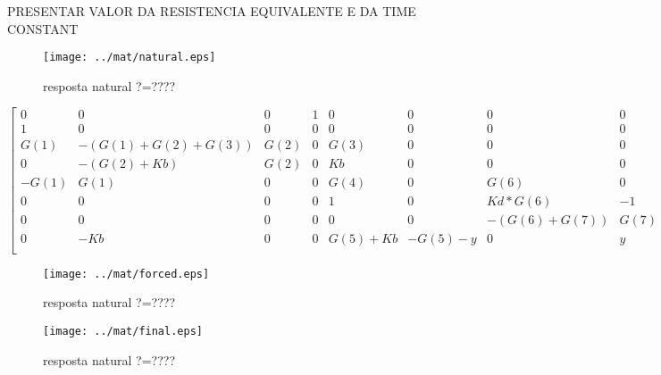PRESENTAR VALOR DA RESISTENCIA EQUIVALENTE E DA TIME CONSTANT




\begin{figure}[H]
\centering
\texttt{[image: ../mat/natural.eps]}
\caption{resposta natural ?=????}
\label{fig:gig_al_2}
\end{figure}







\begin{equation*}
\begin{bmatrix} 
   0 &      0 & 0 & 1 & 0 & 0 & 0 & 0\\
1 &      0 & 0 & 0 & 0 & 0 & 0 & 0\\
G(1) &   -(G(1)+G(2)+G(3)) &     G(2) &    0 &    G(3) &           0 &    0 &    0\\
0 &      -(G(2)+Kb) &            G(2) &     0 &     Kb &           0 &    0 &    0\\
-G(1) &    G(1) &                 0 &       0 &     G(4)          & 0    & G(6)     & 0\\
0 &        0 &                    0 &       0 &      1 &           0 &    Kd*G(6) &  -1\\
0 &        0 &                    0 &        0 &     0 &            0 &    -(G(6)+G(7)) &     G(7)\\
0 &        -Kb &                  0 &         0 &      G(5)+Kb &     -G(5)-y &      0 &         y\\

\end{bmatrix}
 \begin{bmatrix} V_1\\V_2\\V_3\\V_4\\V-5\\V_6\\V_7\\V_8 \end{bmatrix} = 
 \begin{bmatrix} 0 & V_s & 0 & 0 & 0 & 0 & 0 & 0\end{bmatrix}
\end{equation*}


\begin{figure}[H]
\centering
\texttt{[image: ../mat/forced.eps]}
\caption{resposta natural ?=????}
\label{fig:gig_al_2}
\end{figure}




\begin{figure}[H]
\centering
\texttt{[image: ../mat/final.eps]}
\caption{resposta natural ?=????}
\label{fig:gig_al_2}
\end{figure}
